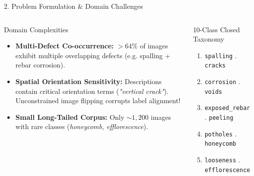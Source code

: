 \documentclass[aspectratio=169]{beamer}
\begin{document}
\begin{frame}{2. Problem Formulation \& Domain Challenges}
  \begin{columns}
    \begin{alertblock}{Domain Complexities}
      \begin{itemize}
        \item \textbf{Multi-Defect Co-occurrence:} $>64\%$ of images exhibit multiple overlapping defects (e.g. spalling + rebar corrosion).
        \item \textbf{Spatial Orientation Sensitivity:} Descriptions contain critical orientation terms (\textit{"vertical crack"}). Unconstrained image flipping corrupts label alignment!
        \item \textbf{Small Long-Tailed Corpus:} Only $\sim 1,200$ images with rare classes (\textit{honeycomb, efflorescence}).
      \end{itemize}
    \end{alertblock}
    \begin{block}{10-Class Closed Taxonomy}
      \begin{enumerate}
        \item \texttt{spalling} . \texttt{cracks}
        \item \texttt{corrosion} . \texttt{voids}
        \item \texttt{exposed\_rebar} . \texttt{peeling}
        \item \texttt{potholes} . \texttt{honeycomb}
        \item \texttt{looseness} . \texttt{efflorescence}
      \end{enumerate}
    \end{block}
  \end{columns}
\end{frame}
\end{document}
